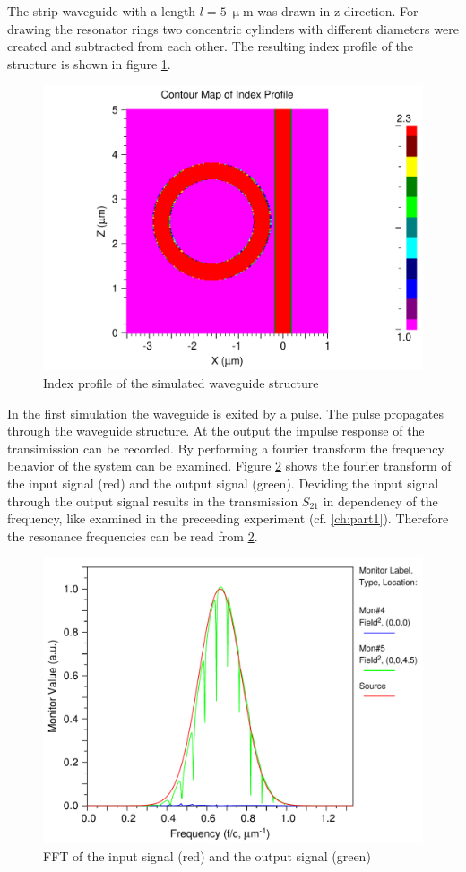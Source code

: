 The strip waveguide with a length $l=5~\upmu$m was drawn in z-direction. For drawing the resonator rings two concentric cylinders with different diameters were created and subtracted from each other. The resulting index profile of the structure is shown in figure \ref{fig:index_profile1}.

\begin{figure}
\centering
\includegraphics[width=.6\columnwidth]{Grafiken/1_index_profile.pdf}%
\caption{Index profile of the simulated waveguide structure}%
\label{fig:index_profile1}%
\end{figure}



In the first simulation the waveguide is exited by a pulse. The pulse propagates through the waveguide structure. At the output the impulse response of the transimission can be recorded. By performing a fourier transform the frequency behavior of the system can be examined. Figure \ref{fig:2_TE_FFT} shows the fourier transform of the input signal (red) and the output signal (green). Deviding the input signal through the output signal results in the transmission $S_{21}$ in dependency of the frequency, like examined in the preceeding experiment (cf. \ref{ch:part1}). Therefore the resonance frequencies can be read from \ref{fig:2_TE_FFT}.  

\begin{figure}
\centering
\includegraphics[width=.6\columnwidth]{Grafiken/2_TE_FFT.pdf}%
\caption{FFT of the input signal (red) and the output signal (green)}%
\label{fig:2_TE_FFT}%
\end{figure}


